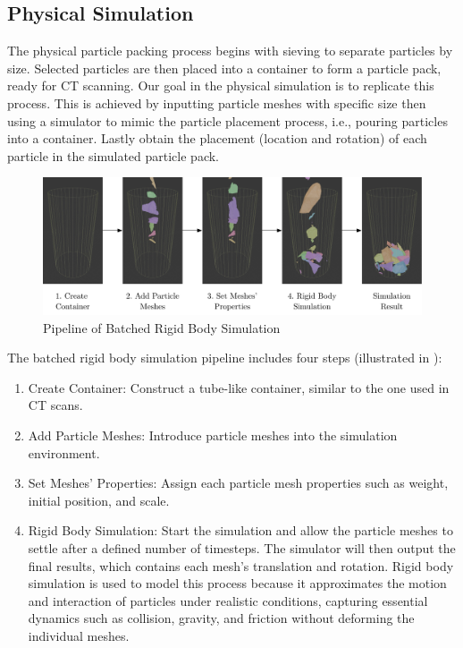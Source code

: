 \documentclass[preprint,12pt]{elsarticle}
\begin{document}
\subsection{Physical Simulation}
The physical particle packing process begins with sieving to separate particles by size. 
Selected particles are then placed into a container to form a particle pack, ready for CT scanning.
Our goal in the physical simulation is to replicate this process.
This is achieved by inputting particle meshes with specific size then using a simulator to mimic the particle placement process, i.e., pouring particles into a container. 
Lastly obtain the placement (location and rotation) of each particle in the simulated particle pack.
\begin{figure}[H]
    \includegraphics[width=\textwidth]{figures/pdf/simulation-pipeline.pdf}
    \caption{Pipeline of Batched Rigid Body Simulation}
    \label{fig:batched_rigid_body_simulation_pipeline}
\end{figure}
\par
The batched rigid body simulation pipeline includes four steps (illustrated in ): 
\begin{enumerate}
    \item Create Container: Construct a tube-like container, similar to the one used in CT scans.
    \item Add Particle Meshes: Introduce particle meshes into the simulation environment.
    \item Set Meshes' Properties: Assign each particle mesh properties such as weight, initial position, and scale.
    \item Rigid Body Simulation: Start the simulation and allow the particle meshes to settle after a defined number of timesteps. The simulator will then output the final results, which contains each mesh's translation and rotation.
    Rigid body simulation is used to model this process because it approximates the motion and interaction of particles under realistic conditions, capturing essential dynamics such as collision, gravity, and friction without deforming the individual meshes.
\end{enumerate}
\end{document}
